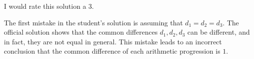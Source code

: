 I would rate this solution a 3.

The first mistake in the student's solution is assuming that $d_1 = d_2 = d_3$. The official solution shows that the common differences $d_1, d_2, d_3$ can be different, and in fact, they are not equal in general. This mistake leads to an incorrect conclusion that the common difference of each arithmetic progression is $1$.
